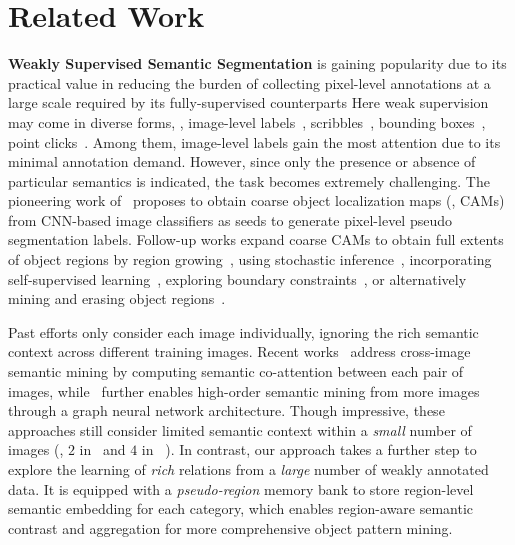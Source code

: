 \documentclass[10pt,twocolumn,letterpaper]{article}
\begin{document}
\section{Related Work}\label{sec:relatedwork}


\noindent\textbf{Weakly Supervised Semantic Segmentation} is gaining popularity due to its practical value in reducing the burden of collecting pixel-level annotations at a large scale required by its fully-supervised counterparts \cite{wang2021hierarchical,zhou2021differentiable,zhou2020motion,zhou2021target,wang2021survey}
Here weak supervision may come in diverse forms, \eg, image-level labels~\cite{wei2016stc,chaudhry2017discovering,zhang2020causal,zhou2021group,wang2021multiple}, scribbles~\cite{lin2016scribblesup,vernaza2017learning}, bounding boxes~\cite{dai2015boxsup,khoreva2017simple,song2019box,oh2021background},  point clicks~\cite{bearman2016s,ke2021universal}. Among them, image-level labels gain the most attention due to its minimal annotation demand. However, since only the presence or absence of particular semantics is indicated, the task becomes extremely challenging. The pioneering work of~\cite{zhou2016learning} proposes to obtain coarse object localization maps (\ie, CAMs) from CNN-based image classifiers as seeds to generate pixel-level pseudo segmentation labels. Follow-up works expand coarse CAMs to obtain full extents of object regions by region growing~\cite{kolesnikov2016seed,wei2018revisiting,huang2018weakly}, using stochastic inference~\cite{lee2019ficklenet}, incorporating self-supervised learning~\cite{chang2020weakly, shimoda2019self, wang2020self}, exploring boundary constraints~\cite{chenweakly, lee2021railroad}, or alternatively mining and erasing object regions~\cite{hou2018self, wei2017object, li2018tell}. 


Past efforts only consider each image individually, ignoring the rich semantic context across different training images. Recent works~\cite{fan2020cian, sun2020mining} address cross-image semantic mining by computing semantic co-attention between each pair of images, while~\cite{zhou2021group} further enables high-order semantic mining from more images through a graph neural network architecture. Though impressive, these approaches still consider limited semantic context within a \textit{small} number of images (\ie, $2$ in~\cite{fan2020cian, sun2020mining} and $4$ in ~\cite{zhou2021group}). 
In contrast, our approach takes a further step to explore the learning of \emph{rich} relations from a \emph{large} number of weakly annotated data.  It is equipped with a \emph{pseudo-region} memory bank to store region-level semantic embedding for each category, which enables region-aware semantic contrast and aggregation for more comprehensive object pattern mining. 
\end{document}
